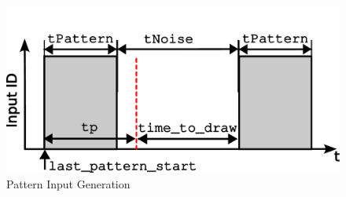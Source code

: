 \begin{figure}[htbp]
  \centering
  \includegraphics[width=0.9\columnwidth]{Figures/input_generator.pdf}
  \caption{Pattern Input Generation}
  \label{fig:input_generator}
\end{figure}


